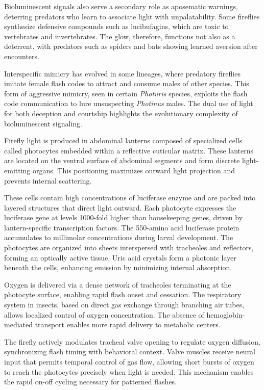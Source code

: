 Bioluminescent signals also serve a secondary role as aposematic warnings, deterring predators who learn to associate light with unpalatability. Some fireflies synthesize defensive compounds such as lucibufagins, which are toxic to vertebrates and invertebrates. The glow, therefore, functions not also as a deterrent, with predators such as spiders and bats showing learned aversion after encounters.

Interspecific mimicry has evolved in some lineages, where predatory fireflies imitate female flash codes to attract and consume males of other species. This form of aggressive mimicry, seen in certain \emph{Photuris} species, exploits the flash code communication to lure unsuspecting \emph{Photinus} males. The dual use of light for both deception and courtship highlights the evolutionary complexity of bioluminescent signaling.

Firefly light is produced in abdominal lanterns composed of specialized cells called photocytes embedded within a reflective cuticular matrix. These lanterns are located on the ventral surface of abdominal segments and form discrete light-emitting organs. This positioning maximizes outward light projection and prevents internal scattering.

These cells contain high concentrations of luciferase enzyme and are packed into layered structures that direct light outward. Each photocyte expresses the luciferase gene at levels 1000-fold higher than housekeeping genes, driven by lantern-specific transcription factors. The 550-amino acid luciferase protein accumulates to millimolar concentrations during larval development. The photocytes are organized into sheets interspersed with tracheoles and reflectors, forming an optically active tissue. Uric acid crystals form a photonic layer beneath the cells, enhancing emission by minimizing internal absorption.

Oxygen is delivered via a dense network of tracheoles terminating at the photocyte surface, enabling rapid flash onset and cessation. The respiratory system in insects, based on direct gas exchange through branching air tubes, allows localized control of oxygen concentration. The absence of hemoglobin-mediated transport enables more rapid delivery to metabolic centers.

The firefly actively modulates tracheal valve opening to regulate oxygen diffusion, synchronizing flash timing with behavioral context. Valve muscles receive neural input that permits temporal control of gas flow, allowing short bursts of oxygen to reach the photocytes precisely when light is needed. This mechanism enables the rapid on-off cycling necessary for patterned flashes.

